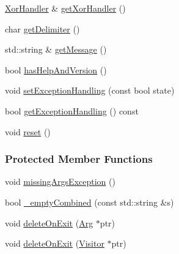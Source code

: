 \begin{DoxyCompactItemize}
\item 
\hyperlink{classTCLAP_1_1XorHandler}{Xor\+Handler} \& \hyperlink{classTCLAP_1_1CmdLine_a805433b7718d1bc5bc9317bbd061449b}{get\+Xor\+Handler} ()
\item 
char \hyperlink{classTCLAP_1_1CmdLine_a3e9f0ac2c1e97d1f8527da713ddd5a8f}{get\+Delimiter} ()
\item 
std\+::string \& \hyperlink{classTCLAP_1_1CmdLine_a8f61a8c201e31ada985fa998180fd40f}{get\+Message} ()
\item 
bool \hyperlink{classTCLAP_1_1CmdLine_a5b23895feae4f4110b77dae372226475}{has\+Help\+And\+Version} ()
\item 
void \hyperlink{classTCLAP_1_1CmdLine_aa02055d8f4864bfa9b505e2d26bbbd87}{set\+Exception\+Handling} (const bool state)
\item 
bool \hyperlink{classTCLAP_1_1CmdLine_af2cd748a91e22df97c878d7eff8c4ca3}{get\+Exception\+Handling} () const 
\item 
void \hyperlink{classTCLAP_1_1CmdLine_a1721ec47c9d9f5ea2eca2f385fcfd2da}{reset} ()
\end{DoxyCompactItemize}
\subsubsection*{Protected Member Functions}
\begin{DoxyCompactItemize}
\item 
void \hyperlink{classTCLAP_1_1CmdLine_a698f47333350312eb949aa1ae4f89ad1}{missing\+Args\+Exception} ()
\item 
bool \hyperlink{classTCLAP_1_1CmdLine_a170a4e711c2a6d58a05e9ad3bc03c08a}{\+\_\+empty\+Combined} (const std\+::string \&s)
\item 
void \hyperlink{classTCLAP_1_1CmdLine_a42d669ed2037ac24fc78883aa8600655}{delete\+On\+Exit} (\hyperlink{classTCLAP_1_1Arg}{Arg} $\ast$ptr)
\item 
void \hyperlink{classTCLAP_1_1CmdLine_a262b8d929eb5b0dfbfc17637c1325c36}{delete\+On\+Exit} (\hyperlink{classTCLAP_1_1Visitor}{Visitor} $\ast$ptr)
\end{DoxyCompactItemize}
